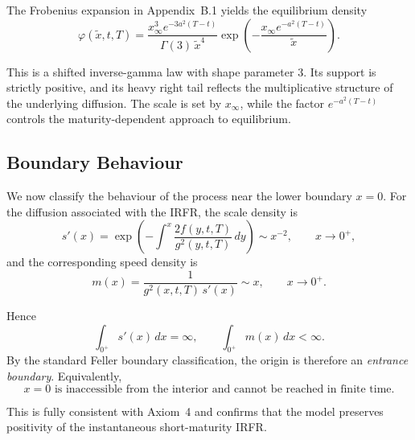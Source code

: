 \documentclass[12pt]{article}
\theoremstyle{statementstyle}
\begin{document}
The Frobenius expansion in Appendix~B.1 yields the equilibrium density
\begin{equation}
\varphi(\widetilde{x}, t, T)
=
\frac{x_{\infty}^{3}e^{-3a^{2}(T-t)}}{\Gamma(3)\,\widetilde{x}^{4}}
\exp\!\left(
-\frac{x_{\infty}e^{-a^{2}(T-t)}}{\widetilde{x}}
\right).
\label{eq:shiftedinversegammapdf}
\tag{4.1.2}
\end{equation}

This is a shifted inverse-gamma law with shape parameter \(3\). Its support is strictly
positive, and its heavy right tail reflects the multiplicative structure of the underlying
diffusion. The scale is set by \(x_{\infty}\), while the factor \(e^{-a^{2}(T-t)}\)
controls the maturity-dependent approach to equilibrium.
\subsection{Boundary Behaviour}
\label{sec:boundary}

We now classify the behaviour of the process near the lower boundary
\(x=0\). For the diffusion associated with the IRFR, the scale density is
\begin{equation}
s'(x)
=
\exp\!\left(
-\!\int^{x}
\frac{2f(y,t,T)}{g^{2}(y,t,T)}\,dy
\right)
\sim x^{-2},
\qquad x\to 0^{+},
\tag{4.2.1}\label{eq:scale-density}
\end{equation}
and the corresponding speed density is
\begin{equation}
m(x)
=
\frac{1}{g^{2}(x,t,T)\,s'(x)}
\sim x,
\qquad x\to 0^{+}.
\tag{4.2.2}\label{eq:speed-density}
\end{equation}

Hence
\[
\int_{0^{+}} s'(x)\,dx = \infty,
\qquad
\int_{0^{+}} m(x)\,dx < \infty.
\]
By the standard Feller boundary classification, the origin is therefore
an \emph{entrance boundary}. Equivalently,
\begin{equation}
\boxed{
x=0 \text{ is inaccessible from the interior and cannot be reached in finite time.}
}
\tag{4.2.3}\label{eq:boundary-classification}
\end{equation}

This is fully consistent with Axiom~4 and confirms that the model
preserves positivity of the instantaneous short-maturity IRFR.

\end{document}
